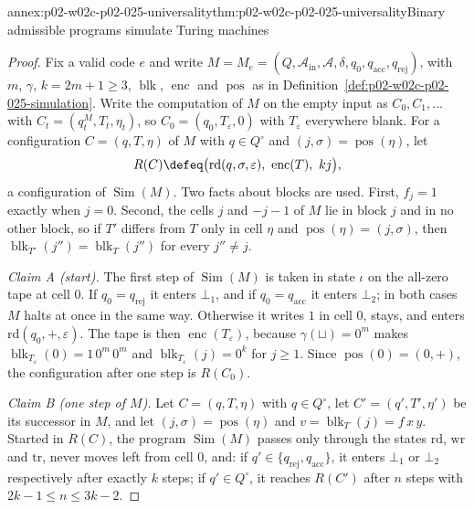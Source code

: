 \begin{annexitem}{annex:p02-w02c-p02-025-universality}{thm:p02-w02c-p02-025-universality}{Binary admissible programs simulate Turing machines}
\begin{proof}
Fix a valid code \(e\) and write \(M=M_e=(Q,\mathcal A_{\mathrm{in}},
\mathcal A,\delta,q_0,q_{\mathrm{acc}},q_{\mathrm{rej}})\), with \(m\),
\(\gamma\), \(k=2m+1\geq3\), \(\operatorname{blk}\), \(\operatorname{enc}\) and
\(\operatorname{pos}\) as in Definition~\ref{def:p02-w02c-p02-025-simulation}.
Write the computation of \(M\) on the empty input as
\(C_0,C_1,\ldots\) with \(C_t=(q_t^M,T_t,\eta_t)\), so \(C_0=(q_0,T_\varepsilon,0)\)
with \(T_\varepsilon\) everywhere blank.  For a configuration \(C=(q,T,\eta)\)
of \(M\) with \(q\in Q^{\circ}\) and \((j,\sigma)=\operatorname{pos}(\eta)\), let
\[
 R(C)\defeq\bigl(\mathrm{rd}(q,\sigma,\varepsilon),\ \operatorname{enc}(T),\
 kj\bigr),
\]
a configuration of \(\operatorname{Sim}(M)\).  Two facts about blocks are used.
First, \(f_j=1\) exactly when \(j=0\).  Second, the cells \(j\) and \(-j-1\) of
\(M\) lie in block \(j\) and in no other block, so if \(T'\) differs from \(T\)
only in cell \(\eta\) and \(\operatorname{pos}(\eta)=(j,\sigma)\), then
\(\operatorname{blk}_{T'}(j'')=\operatorname{blk}_T(j'')\) for every
\(j''\neq j\).

\emph{Claim A (start).}  The first step of \(\operatorname{Sim}(M)\) is taken
in state \(\iota\) on the all-zero tape at cell \(0\).  If \(q_0=q_{\mathrm{rej}}\)
it enters \(\bot_1\), and if \(q_0=q_{\mathrm{acc}}\) it enters \(\bot_2\); in
both cases \(M\) halts at once in the same way.  Otherwise it writes \(1\) in
cell \(0\), stays, and enters \(\mathrm{rd}(q_0,+,\varepsilon)\).  The tape is then
\(\operatorname{enc}(T_\varepsilon)\), because \(\gamma(\sqcup)=0^m\) makes
\(\operatorname{blk}_{T_\varepsilon}(0)=1\,0^m\,0^m\) and
\(\operatorname{blk}_{T_\varepsilon}(j)=0^k\) for \(j\geq1\).  Since
\(\operatorname{pos}(0)=(0,+)\), the configuration after one step is \(R(C_0)\).

\emph{Claim B (one step of \(M\)).}  Let \(C=(q,T,\eta)\) with \(q\in Q^{\circ}\),
let \(C'=(q',T',\eta')\) be its successor in \(M\), and let
\((j,\sigma)=\operatorname{pos}(\eta)\) and
\(v=\operatorname{blk}_T(j)=f\,x\,y\).  Started in \(R(C)\), the program
\(\operatorname{Sim}(M)\) passes only through the states
\(\mathrm{rd}\), \(\mathrm{wr}\) and \(\mathrm{tr}\), never moves left from
cell \(0\), and: if \(q'\in\{q_{\mathrm{rej}},q_{\mathrm{acc}}\}\), it enters
\(\bot_1\) or \(\bot_2\) respectively after exactly \(k\) steps; if
\(q'\in Q^{\circ}\), it reaches \(R(C')\) after \(n\) steps with
\(2k-1\leq n\leq 3k-2\).


\end{proof}
\end{annexitem}
